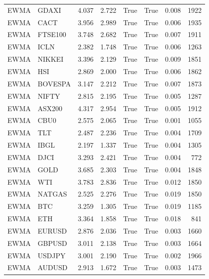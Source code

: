 \begin{table}[H]
\begin{tabular}{llrrrrrr}
EWMA & GDAXI & 4.037 & 2.722 & True & True & 0.008 & 1922 \\
EWMA & CACT & 3.956 & 2.989 & True & True & 0.006 & 1935 \\
EWMA & FTSE100 & 3.748 & 2.682 & True & True & 0.007 & 1911 \\
EWMA & ICLN & 2.382 & 1.748 & True & True & 0.006 & 1263 \\
EWMA & NIKKEI & 3.396 & 2.129 & True & True & 0.009 & 1851 \\
EWMA & HSI & 2.869 & 2.000 & True & True & 0.006 & 1862 \\
EWMA & BOVESPA & 3.147 & 2.212 & True & True & 0.007 & 1873 \\
EWMA & NIFTY & 2.815 & 2.195 & True & True & 0.005 & 1287 \\
EWMA & ASX200 & 4.317 & 2.954 & True & True & 0.005 & 1912 \\
EWMA & CBU0 & 2.575 & 2.065 & True & True & 0.001 & 1055 \\
EWMA & TLT & 2.487 & 2.236 & True & True & 0.004 & 1709 \\
EWMA & IBGL & 2.197 & 1.337 & True & True & 0.004 & 1305 \\
EWMA & DJCI & 3.293 & 2.421 & True & True & 0.004 & 772 \\
EWMA & GOLD & 3.685 & 2.303 & True & True & 0.004 & 1848 \\
EWMA & WTI & 3.783 & 2.836 & True & True & 0.012 & 1850 \\
EWMA & NATGAS & 2.525 & 2.276 & True & True & 0.019 & 1850 \\
EWMA & BTC & 3.259 & 1.305 & True & True & 0.019 & 1185 \\
EWMA & ETH & 3.364 & 1.858 & True & True & 0.018 & 841 \\
EWMA & EURUSD & 2.876 & 2.036 & True & True & 0.003 & 1660 \\
EWMA & GBPUSD & 3.011 & 2.138 & True & True & 0.003 & 1664 \\
EWMA & USDJPY & 3.001 & 2.190 & True & True & 0.002 & 1966 \\
EWMA & AUDUSD & 2.913 & 1.672 & True & True & 0.003 & 1473 \\
\bottomrule
\end{tabular}
\end{table}
